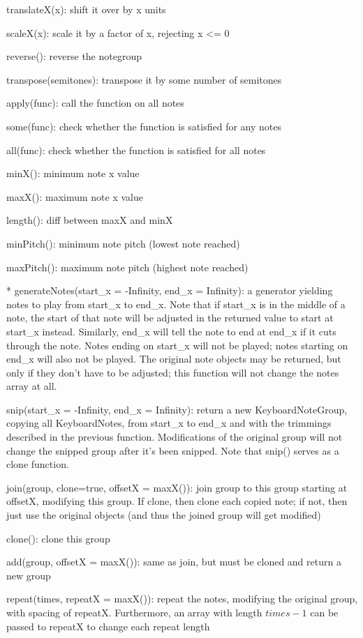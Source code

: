 \documentclass{article}
\begin{document}
translateX(x): shift it over by x units

scaleX(x): scale it by a factor of x, rejecting x <= 0

reverse(): reverse the notegroup

transpose(semitones): transpose it by some number of semitones

apply(func): call the function on all notes

some(func): check whether the function is satisfied for any notes

all(func): check whether the function is satisfied for all notes

minX(): minimum note x value

maxX(): maximum note x value

length(): diff between maxX and minX

minPitch(): minimum note pitch (lowest note reached)

maxPitch(): maximum note pitch (highest note reached)

* generateNotes(start\_x = -Infinity, end\_x = Infinity): a generator yielding notes to play from start\_x to end\_x. Note that if start\_x is in the middle of a note, the start of that note will be adjusted in the returned value to start at start\_x instead. Similarly, end\_x will tell the note to end at end\_x if it cuts through the note. Notes ending on start\_x will not be played; notes starting on end\_x will also not be played. The original note objects may be returned, but only if they don't have to be adjusted; this function will not change the notes array at all.

snip(start\_x = -Infinity, end\_x = Infinity): return a new KeyboardNoteGroup, copying all KeyboardNotes, from start\_x to end\_x and with the trimmings described in the previous function. Modifications of the original group will not change the snipped group after it's been snipped. Note that snip() serves as a clone function.

join(group, clone=true, offsetX = maxX()): join group to this group starting at offsetX, modifying this group. If clone, then clone each copied note; if not, then just use the original objects (and thus the joined group will get modified)

clone(): clone this group

add(group, offsetX = maxX()): same as join, but must be cloned and return a new group

repeat(times, repeatX = maxX()): repeat the notes, modifying the original group, with spacing of repeatX. Furthermore, an array with length $times-1$ can be passed to repeatX to change each repeat length
\end{document}
